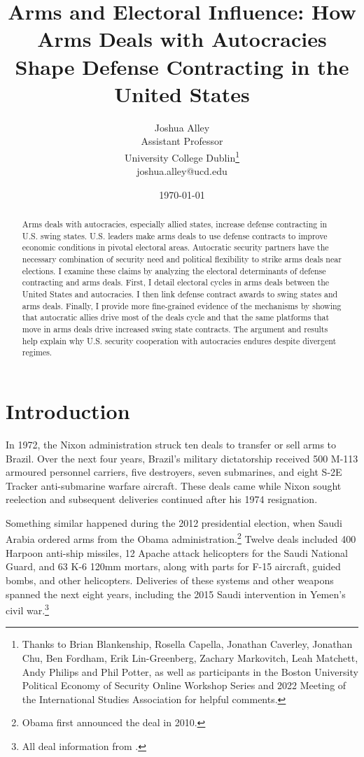 \documentclass[12pt]{article}
\title{\textbf{Arms and Electoral Influence: How Arms Deals with Autocracies Shape Defense Contracting in the United States}}
\author{Joshua Alley \\
Assistant Professor \\
University College Dublin\thanks{Thanks to Brian Blankenship, Rosella Capella, Jonathan Caverley, Jonathan Chu, Ben Fordham, Erik Lin-Greenberg, Zachary Markovitch, Leah Matchett, Andy Philips and Phil Potter, as well as participants in the Boston University Political Economy of Security Online Workshop Series and 2022 Meeting of the International Studies Association for helpful comments.} \\
joshua.alley@ucd.edu
}
\date{\today}
\begin{document}
\maketitle 

\begin{abstract} 
Arms deals with autocracies, especially allied states, increase defense contracting in U.S. swing states. 
U.S. leaders make arms deals to use defense contracts to improve economic conditions in pivotal electoral areas.
Autocratic security partners have the necessary combination of security need and political flexibility to strike arms deals near elections. 
I examine these claims by analyzing the electoral determinants of defense contracting and arms deals.  
First, I detail electoral cycles in arms deals between the United States and autocracies. 
I then link defense contract awards to swing states and arms deals.
Finally, I provide more fine-grained evidence of the mechanisms by showing that autocratic allies drive most of the deals cycle and that the same platforms that move in arms deals drive increased swing state contracts.  
The argument and results help explain why U.S. security cooperation with autocracies endures despite divergent regimes. 
\end{abstract} 


\newpage 
\doublespace 


\section{Introduction}



In 1972, the Nixon administration struck ten deals to transfer or sell arms to Brazil.
Over the next four years, Brazil's military dictatorship received 500 M-113 armoured personnel carriers, five destroyers, seven submarines, and eight S-2E Tracker anti-submarine warfare aircraft.
These deals came while Nixon sought reelection and subsequent deliveries continued after his 1974 resignation. 


Something similar happened during the 2012 presidential election, when Saudi Arabia ordered arms from the Obama administration.\footnote{Obama first announced the deal in 2010.} 
Twelve deals included 400 Harpoon anti-ship missiles, 12 Apache attack helicopters for the Saudi National Guard, and 63 K-6 120mm mortars, along with parts for F-15 aircraft, guided bombs, and other helicopters. 
Deliveries of these systems and other weapons spanned the next eight years, including the 2015 Saudi intervention in Yemen's civil war.\footnote{All deal information from \citep{SIPRI2021}.}
\end{document}
